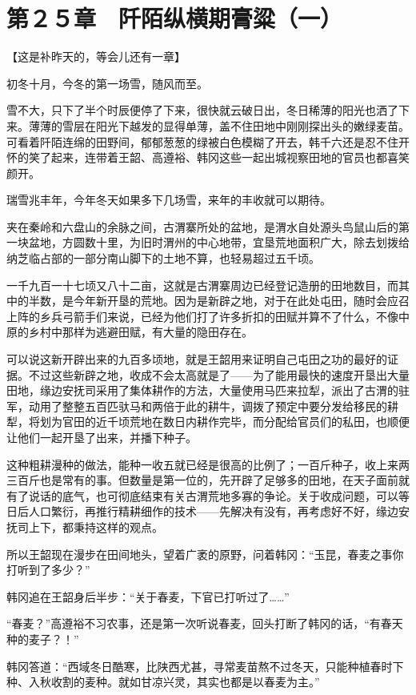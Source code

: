 \section{第２５章　阡陌纵横期膏粱（一）}

【这是补昨天的，等会儿还有一章】

初冬十月，今冬的第一场雪，随风而至。

雪不大，只下了半个时辰便停了下来，很快就云破日出，冬日稀薄的阳光也洒了下来。薄薄的雪层在阳光下越发的显得单薄，盖不住田地中刚刚探出头的嫩绿麦苗。可看着阡陌连绵的田野间，郁郁葱葱的绿被白色模糊了开去，韩千六还是忍不住开怀的笑了起来，连带着王韶、高遵裕、韩冈这些一起出城视察田地的官员也都喜笑颜开。

瑞雪兆丰年，今年冬天如果多下几场雪，来年的丰收就可以期待。

夹在秦岭和六盘山的余脉之间，古渭寨所处的盆地，是渭水自处源头鸟鼠山后的第一块盆地，方圆数十里，为旧时渭州的中心地带，宜垦荒地面积广大，除去划拨给纳芝临占部的一部分南山脚下的土地不算，也轻易超过五千顷。

一千九百一十七顷又八十二亩，这就是古渭寨周边已经登记造册的田地数目，而其中的半数，是今年新开垦的荒地。因为是新辟之地，对于在此处屯田，随时会应召上阵的乡兵弓箭手们来说，已经为他们打了许多折扣的田赋并算不了什么，不像中原的乡村中那样为逃避田赋，有大量的隐田存在。

可以说这新开辟出来的九百多顷地，就是王韶用来证明自己屯田之功的最好的证据。不过这些新辟之地，收成不会太高就是了——为了能用最快的速度开垦出大量田地，缘边安抚司采用了集体耕作的方法，大量使用马匹来拉犁，派出了古渭的驻军，动用了整整五百匹驮马和两倍于此的耕牛，调拨了预定中要分发给移民的耕犁，将划为官田的近千顷荒地在数日内耕作完毕，而分配给官员们的私田，也顺便让他们一起开垦了出来，并播下种子。

这种粗耕漫种的做法，能种一收五就已经是很高的比例了；一百斤种子，收上来两三百斤也是常有的事。但数量是第一位的，先开辟了足够多的田地，在天子面前就有了说话的底气，也可彻底结束有关古渭荒地多寡的争论。关于收成问题，可以等日后人口繁衍，再推行精耕细作的技术——先解决有没有，再考虑好不好，缘边安抚司上下，都秉持这样的观点。

所以王韶现在漫步在田间地头，望着广袤的原野，问着韩冈：“玉昆，春麦之事你打听到了多少？”

韩冈追在王韶身后半步：“关于春麦，下官已打听过了……”

“春麦？”高遵裕不习农事，还是第一次听说春麦，回头打断了韩冈的话，“有春天种的麦子？！”

韩冈答道：“西域冬日酷寒，比陕西尤甚，寻常麦苗熬不过冬天，只能种植春时下种、入秋收割的麦种。就如甘凉兴灵，其实也都是以春麦为主。”

